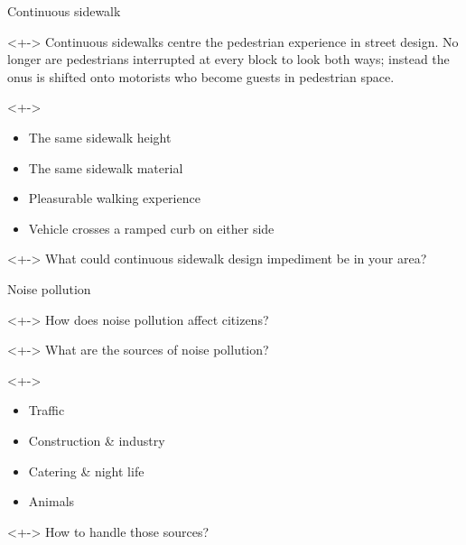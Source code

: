 \documentclass{beamer}
\begin{document}
    \begin{frame}{Continuous sidewalk}
        \begin{block}
            <+->{}
            Continuous sidewalks centre the pedestrian experience in street design.
            No longer are pedestrians interrupted at every block to look both ways; instead the onus is shifted onto motorists who become guests in pedestrian space.
        \end{block}
        \begin{block}
            <+->{}
            \begin{itemize}
                \item The same sidewalk height
                \item The same sidewalk material
                \item Pleasurable walking experience
                \item Vehicle crosses a ramped curb on either side
            \end{itemize}
        \end{block}
        \begin{block}
            <+->{}
            What could continuous sidewalk design impediment be in your area?
        \end{block}
    \end{frame}

    \begin{frame}{Noise pollution}
        \begin{block}
            <+->{}
            How does noise pollution affect citizens?
        \end{block}
        \begin{block}
            <+->{}
            What are the sources of noise pollution?
        \end{block}
        \begin{block}
            <+->{}
            \begin{itemize}
                \item Traffic
                \item Construction \& industry
                \item Catering \& night life
                \item Animals
            \end{itemize}
        \end{block}
        \begin{block}
            <+->{}
            How to handle those sources?
        \end{block}
    \end{frame}
\end{document}
